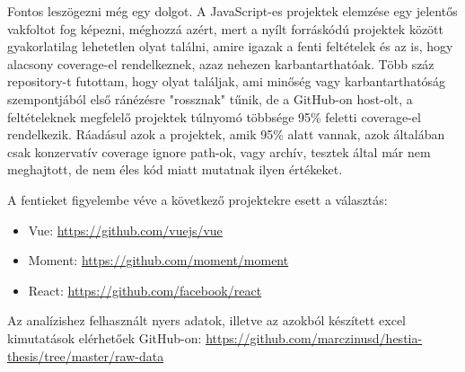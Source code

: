 Fontos leszögezni még egy dolgot. A JavaScript-es projektek elemzése egy jelentős vakfoltot fog képezni, méghozzá azért, mert a nyílt forráskódú projektek között gyakorlatilag lehetetlen olyat találni, amire igazak a fenti feltételek és az is, hogy alacsony coverage-el rendelkeznek, azaz nehezen karbantarthatóak. Több száz repository-t futottam, hogy olyat találjak, ami minőség vagy karbantarthatóság szempontjából első ránézésre "rossznak" tűnik, de a GitHub-on host-olt, a feltételeknek megfelelő projektek túlnyomó többsége 95\% feletti coverage-el rendelkezik. Ráadásul azok a projektek, amik 95\% alatt vannak, azok általában csak konzervatív coverage ignore path-ok, vagy archív, tesztek által már nem meghajtott, de nem éles kód miatt mutatnak ilyen értékeket.

A fentieket figyelembe véve a következő projektekre esett a választás:
\begin{itemize}
    \item Vue: \url{https://github.com/vuejs/vue}
    \item Moment: \url{https://github.com/moment/moment}
    \item React: \url{https://github.com/facebook/react}
\end{itemize}

Az analízishez felhasznált nyers adatok, illetve az azokból készített excel kimutatások elérhetőek GitHub-on: \url{https://github.com/marczinusd/hestia-thesis/tree/master/raw-data}

\pagebreak


\pagebreak


\pagebreak
